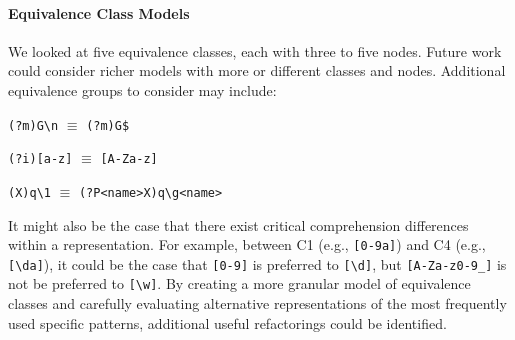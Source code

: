 \paragraph{Equivalence Class Models}
We looked at five equivalence classes, each with three to five nodes.
Future work could consider richer models with more or different classes and nodes.
%
Additional equivalence groups to consider may include:
\begin{description} \itemsep -2pt
\item[Multi line option]  \verb!(?m)G\n! $\equiv$ \verb!(?m)G$!
\item[Case insensitive]  \verb!(?i)[a-z]! $\equiv$ \verb![A-Za-z]!
\item[Backreferences]  \verb!(X)q\1! $\equiv$ \verb!(?P<name>X)q\g<name>!
\end{description}



It might also be the case that there exist critical comprehension differences within a representation. For example, between C1 (e.g., \verb![0-9a]!) and C4 (e.g., \verb![\da]!), it could be the case that \verb![0-9]! is preferred to \verb![\d]!, but \verb![A-Za-z0-9_]! is not be preferred to \verb![\w]!.
By creating a more granular model of equivalence classes  and carefully evaluating alternative representations of the most frequently used specific patterns,  additional useful refactorings could be identified.



